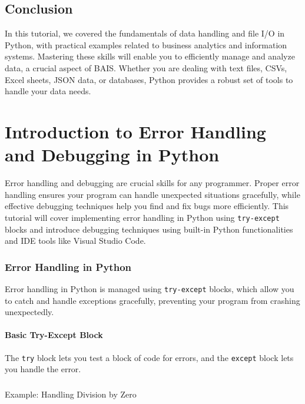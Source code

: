 \documentclass[
  letterpaper,
  DIV=11,
  numbers=noendperiod]{scrreprt}
\makeatletter
\let\oldparagraph\paragraph
\renewcommand{\paragraph}{
    \@ifstar
      \xxxParagraphStar
      \xxxParagraphNoStar
  }
\newcommand{\xxxParagraphStar}[1]{\oldparagraph*{#1}\mbox{}}
\newcommand{\xxxParagraphNoStar}[1]{\oldparagraph{#1}\mbox{}}
\makeatother
\begin{document}
\section{Conclusion}\label{conclusion-9}

In this tutorial, we covered the fundamentals of data handling and file
I/O in Python, with practical examples related to business analytics and
information systems. Mastering these skills will enable you to
efficiently manage and analyze data, a crucial aspect of BAIS. Whether
you are dealing with text files, CSVs, Excel sheets, JSON data, or
databases, Python provides a robust set of tools to handle your data
needs.


\chapter{Introduction to Error Handling and Debugging in
Python}\label{introduction-to-error-handling-and-debugging-in-python}

Error handling and debugging are crucial skills for any programmer.
Proper error handling ensures your program can handle unexpected
situations gracefully, while effective debugging techniques help you
find and fix bugs more efficiently. This tutorial will cover
implementing error handling in Python using \texttt{try-except} blocks
and introduce debugging techniques using built-in Python functionalities
and IDE tools like Visual Studio Code.

\subsection{Error Handling in Python}\label{error-handling-in-python}

Error handling in Python is managed using \texttt{try-except} blocks,
which allow you to catch and handle exceptions gracefully, preventing
your program from crashing unexpectedly.

\subsubsection{Basic Try-Except Block}\label{basic-try-except-block}

The \texttt{try} block lets you test a block of code for errors, and the
\texttt{except} block lets you handle the error.

\paragraph{Example: Handling Division by
Zero}\label{example-handling-division-by-zero}
\end{document}
